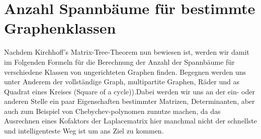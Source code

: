 
\section{Anzahl Spannbäume für bestimmte Graphenklassen}
Nachdem Kirchhoff's Matrix-Tree-Theorem nun bewiesen ist, werden wir damit im Folgenden Formeln für die Berechnung der Anzahl der Spannbäume für verschiedene Klassen von ungerichteten Graphen finden. Begegnen werden uns unter Anderem der vollständige Graph, multipartite Graphen, Räder und as Quadrat eines Kreises (Square of a cycle)).Dabei werden wir uns an der ein- oder anderen Stelle ein paar Eigenschaften bestimmter Matrizen, Determinanten, aber auch zum Beispiel von Chebychev-polynomen zunutze machen, da das Ausrechnen eines Kofaktors der Laplacematrix hier manchmal nicht der schnellste und intelligenteste Weg ist um ans Ziel zu kommen. 








